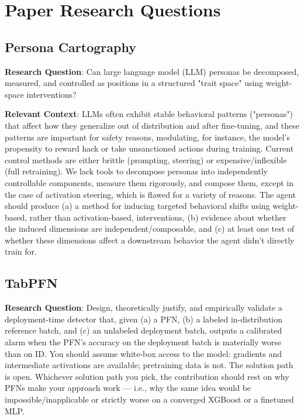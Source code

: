 \usetikzlibrary{calc,positioning}
\pgfplotsset{compat=1.18}


\section{Paper Research Questions}
\label{app:research-questions}

\subsection{Persona Cartography}

\textbf{Research Question}: Can large language model (LLM) personas be decomposed, measured, and controlled as positions in a structured "trait space" using weight-space interventions?

\textbf{Relevant Context}: LLMs often exhibit stable behavioral patterns ("personas") that affect how they generalize out of distribution and after fine-tuning, and these patterns are important for safety reasons, modulating, for instance, the model's propensity to reward hack or take unsanctioned actions during training. Current control methods are either brittle (prompting, steering) or expensive/inflexible (full retraining). We lack tools to decompose personas into independently controllable components, measure them rigorously, and compose them, except in the case of activation steering, which is flawed for a variety of reasons. The agent should produce (a) a method for inducing targeted behavioral shifts using weight-based, rather than activation-based, interventions, (b) evidence about whether the induced dimensions are independent/composable, and (c) at least one test of whether these dimensions affect a downstream behavior the agent didn't directly train for.


\subsection{TabPFN}

\textbf{Research Question}: Design, theoretically justify, and empirically validate a deployment-time detector that, given (a) a PFN, (b) a labeled in-distribution reference batch, and (c) an unlabeled deployment batch, outputs a calibrated alarm when the PFN's accuracy on the deployment batch is materially worse than on ID. You should assume white-box access to the model: gradients and intermediate activations are available; pretraining data is not. The solution path is open. Whichever solution path you pick, the contribution should rest on why PFNs make your approach work — i.e., why the same idea would be impossible/inapplicable or strictly worse on a converged XGBoost or a finetuned MLP.

